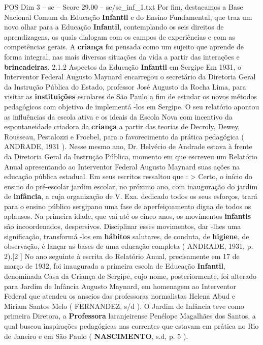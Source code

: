 \begin{textsample}{POS Dim 3 – se – Score 29.00 – se/se\_inf\_1.txt}
Por fim, destacamos a Base Nacional Comum da Educação \textbf{Infantil} e do Ensino Fundamental, que traz um novo olhar para a Educação \textbf{Infantil}, contemplando os seis direitos de aprendizagens, os quais dialogam com os campos de experiências e com as competências gerais.
A \textbf{criança} foi pensada como um sujeito que aprende de forma integral, nas mais diversas situações da vida a partir das interações e \textbf{brincadeiras}. 2.1.2 Aspectos da Educação \textbf{Infantil} em Sergipe Em 1931, o Interventor Federal Augusto Maynard encarregou o secretário da Diretoria Geral da Instrução Pública do Estado, professor José Augusto da Rocha Lima, para visitar as \textbf{instituições} escolares de São Paulo a fim de estudar os novos métodos pedagógicos com objetivo de implementá -los em Sergipe.
O seu relatório apontou as influências da escola ativa e os ideais da Escola Nova com incentivo da espontaneidade criadora da \textbf{criança} a partir das teorias de Decroly, Dewey, Rousseau, Pestalozzi e Froebel, para o favorecimento da prática pedagógica ( ANDRADE, 1931 ).
Nesse mesmo ano, Dr.
Helvécio de Andrade estava à frente da Diretoria Geral da Instrução Pública, momento em que escreveu um Relatório Anual apresentando ao Interventor Federal Augusto Maynard suas ações na educação pública estadual.
Em seus escritos ressaltou que : > Certo, o início do ensino do pré-escolar jardim escolar, no próximo ano, com inauguração do jardim de \textbf{infância}, a cuja organização de V.
Exa. dedicado todos os seus esforços, trará para o ensino público sergipano uma fase de aperfeiçoamento digna de todos os aplausos.
Na primeira idade, que vai até os cinco anos, os movimentos \textbf{infantis} são incoordenados, despersivos.
Disciplinar esses movimentos, dar -lhes uma significação, transformá -los em \textbf{hábitos} salutares, de conduta, de \textbf{higiene}, de observação, é lançar as bases de uma educação completa ( ANDRADE, 1931, p. 2).[2 ] No ano seguinte à escrita do Relatório Anual, precisamente em 17 de março de 1932, foi inaugurada a primeira escola de Educação \textbf{Infantil}, denominada Casa da Criança de Sergipe, cujo nome, posteriormente, foi alterado para Jardim de Infância Augusto Maynard, em homenagem ao Interventor Federal que atendeu os anseios das professoras normalistas Helena Abud e Miriam Santos Melo ( FERNANDEZ, s/d ).
O Jardim de Infância teve como primeira Diretora, a \textbf{Professora} laranjeirense Penélope Magalhães dos Santos, a qual buscou inspirações pedagógicas nas correntes que estavam em prática no Rio de Janeiro e em São Paulo ( \textbf{NASCIMENTO}, s.d, p. 5 ).

\end{textsample}

